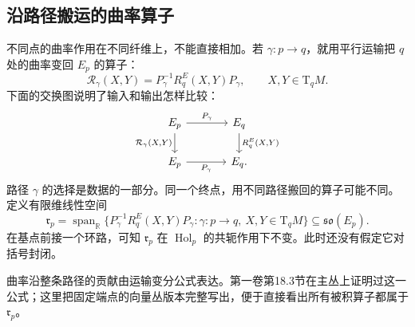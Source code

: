 \subsection{沿路径搬运的曲率算子}
\label{g3:subsec:0501:05}

不同点的曲率作用在不同纤维上，不能直接相加。若 \(\gamma:p\to q\)，就用平行运输把 \(q\) 处的曲率变回 \(E_p\) 的算子：
\begin{equation}\label{g3:eq:transported-curvature}
	\mathcal R_\gamma(X,Y)=P_\gamma^{-1}R^E_q(X,Y)P_\gamma,
	\qquad X,Y\in\mathrm T_qM.
\end{equation}
下面的交换图说明了输入和输出怎样比较：
\[
	\begin{tikzcd}[column sep=large]
		E_p \arrow[r,"P_\gamma"] \arrow[d,"{\mathcal R_\gamma(X,Y)}"']
		& E_q \arrow[d,"{R^E_q(X,Y)}"]\\
		E_p \arrow[r,"P_\gamma"'] & E_q.
	\end{tikzcd}
\]
路径 \(\gamma\) 的选择是数据的一部分。同一个终点，用不同路径搬回的算子可能不同。定义有限维线性空间
\begin{equation}\label{g3:eq:transported-curvature-span}
	\mathfrak r_p=\operatorname{span}_{\mathbb R}
	\{P_\gamma^{-1}R^E_q(X,Y)P_\gamma:
	\gamma:p\to q,\ X,Y\in\mathrm T_qM\}
	\subseteq\mathfrak{so}(E_p).
\end{equation}
在基点前接一个环路，可知 \(\mathfrak r_p\) 在 \(\operatorname{Hol}_p\) 的共轭作用下不变。此时还没有假定它对括号封闭。

\ProseParagraphBreak

曲率沿整条路径的贡献由运输变分公式表达。第一卷第18.3节在主丛上证明过这一公式；这里把固定端点的向量丛版本完整写出，便于直接看出所有被积算子都属于 \(\mathfrak r_p\)。

